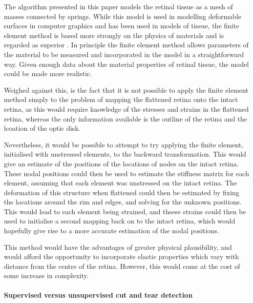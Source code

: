 \documentclass[10pt]{article}
\begin{document}
The algorithm presented in this paper models the retinal tissue as a
mesh of masses connected by springs. While this model is used in
modelling deformable surfaces in computer graphics and has been used
in models of tissue, the finite element method is based more strongly
on the physics of materials and is regarded as superior
\cite{CartEtal05appl}. In principle the finite element method allows
parameters of the material to be measured and incorporated in the
model in a straightforward way. Given enough data about
the material properties of retinal tissue, the model could be made
more realistic. 

Weighed against this, is the fact that it is not possible to apply the
finite element method simply to the problem of mapping the flattened
retina onto the intact retina, as this would require knowledge of the
stresses and strains in the flattened retina, whereas the only
information available is the outline of the retina and the lcoation of
the optic disk. 

Nevertheless, it would be possible to attempt to try applying the
finite element, initialised with unstressed elements, to the backward
transformation. This would give an estimate of the positions of the
locations of nodes on the intact retina. These nodal positions could
then be used to estimate the stiffness matrix for each element,
assuming that each element was unstressed on the intact retina. The
deformation of this structure when flattened could then be estimated
by fixing the locations around the rim and edges, and solving for the
unknown positions. This would lead to each element being strained, and
thsese strains could then be used to initialise a second mapping back
on to the intact retina, which would hopefully give rise to a more
accurate estimation of the nodal positions. 

This method would have the advantages of greater physical plausibility,
and would afford the opportunity to incorporate elastic properties
which vary with distance from the centre of the retina. However, this
would come at the cost of some increase in complexity.

\paragraph{Supervised versus unsupervised cut and tear detection}
\label{fold-sphere:sec:superv-vers-unsup}
\end{document}
